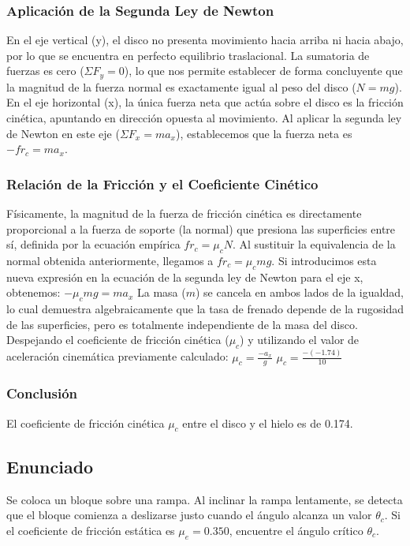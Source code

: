 \documentclass[12pt]{article}
\begin{document}
\subsubsection*{Aplicación de la Segunda Ley de Newton}
En el eje vertical (y), el disco no presenta movimiento hacia arriba ni hacia abajo, por lo que se encuentra en perfecto equilibrio traslacional. La sumatoria de fuerzas es cero ($\Sigma F_y = 0$), lo que nos permite establecer de forma concluyente que la magnitud de la fuerza normal es exactamente igual al peso del disco ($N = mg$).
En el eje horizontal (x), la única fuerza neta que actúa sobre el disco es la fricción cinética, apuntando en dirección opuesta al movimiento. Al aplicar la segunda ley de Newton en este eje ($\Sigma F_x = ma_x$), establecemos que la fuerza neta es $-fr_c = ma_x$.

\subsubsection*{Relación de la Fricción y el Coeficiente Cinético}
Físicamente, la magnitud de la fuerza de fricción cinética es directamente proporcional a la fuerza de soporte (la normal) que presiona las superficies entre sí, definida por la ecuación empírica $fr_c = \mu_c N$. Al sustituir la equivalencia de la normal obtenida anteriormente, llegamos a $fr_c = \mu_c mg$. 
Si introducimos esta nueva expresión en la ecuación de la segunda ley de Newton para el eje x, obtenemos:
$-\mu_c mg = ma_x$
La masa ($m$) se cancela en ambos lados de la igualdad, lo cual demuestra algebraicamente que la tasa de frenado depende de la rugosidad de las superficies, pero es totalmente independiente de la masa del disco. Despejando el coeficiente de fricción cinética ($\mu_c$) y utilizando el valor de aceleración cinemática previamente calculado:
$\mu_c = \frac{-a_x}{g}$
$\mu_c = \frac{-(-1.74)}{10}$

\subsubsection*{Conclusión}
El coeficiente de fricción cinética $\mu_c$ entre el disco y el hielo es de 0.174.

\newpage

\subsection*{Enunciado}
Se coloca un bloque sobre una rampa. Al inclinar la rampa lentamente, se detecta que el bloque comienza a deslizarse justo cuando el ángulo alcanza un valor $\theta_c$. Si el coeficiente de fricción estática es $\mu_e = 0.350$, encuentre el ángulo crítico $\theta_c$.
\end{document}
